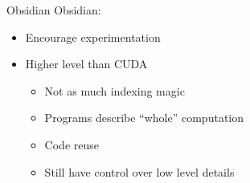 \documentclass[xcolor=dvipsnames]{beamer}
\begin{document}
%

\begin{frame}{Obsidian} 
  Obsidian: 
  \begin{itemize} 
    \item Encourage experimentation
    \item Higher level than CUDA 
      \begin{itemize} 
        \item Not as much indexing magic
        \item Programs describe ``whole'' computation
        \item Code reuse 
        \item Still have control over low level details
      \end{itemize} 
  \end{itemize}  
\end{frame}
\end{document}

